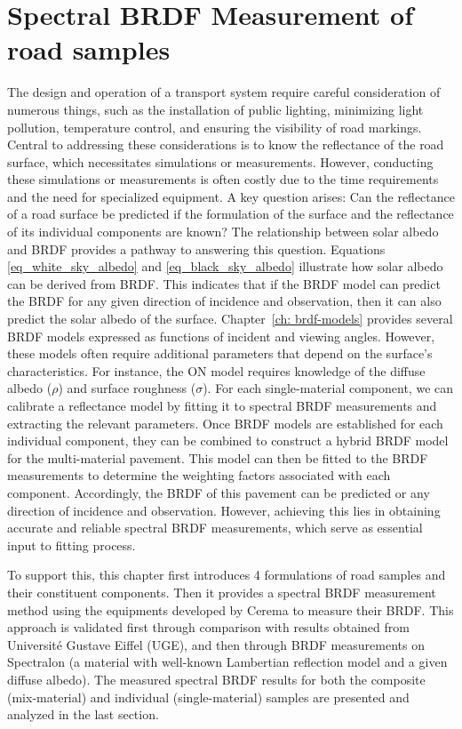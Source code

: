 \chapter{Spectral BRDF Measurement of road samples}



The design and operation of a transport system require careful consideration of numerous things, such as the installation of public lighting, minimizing light pollution, temperature control, and ensuring the visibility of road markings.
Central to addressing these considerations is to know the reflectance of the road surface, which necessitates simulations or measurements.
However, conducting these simulations or measurements is often costly due to the time requirements and the need for specialized equipment.
A key question arises: Can the reflectance of a road surface be predicted if the formulation of the surface and the reflectance of its individual components are known?
The relationship between solar albedo and BRDF provides a pathway to answering this question.
Equations \eqref{eq_white_sky_albedo} and \eqref{eq_black_sky_albedo} illustrate how solar albedo can be derived from BRDF.
This indicates that if the BRDF model can predict the BRDF for any given direction of incidence and observation, then it can also predict the solar albedo of the surface.
Chapter~\ref{ch: brdf-models} provides several BRDF models expressed as functions of incident and viewing angles.
However, these models often require additional parameters that depend on the surface's characteristics.
For instance, the ON model requires knowledge of the diffuse albedo ($\rho$) and surface roughness ($\sigma$).
For each single-material component, we can calibrate a reflectance model by fitting it to spectral BRDF measurements and extracting the relevant parameters.
Once BRDF models are established for each individual component, they can be combined to construct a hybrid BRDF model for the multi-material pavement.
This model can then be fitted to the BRDF measurements to determine the weighting factors associated with each component.
Accordingly, the BRDF of this pavement can be predicted or any direction of incidence and observation.
However, achieving this lies in obtaining accurate and reliable spectral BRDF measurements, which serve as essential input to fitting process.

To support this, this chapter first introduces 4 formulations of road samples and their constituent components.
Then it provides a spectral BRDF measurement method using the equipments developed by Cerema to measure their BRDF.
This approach is validated first through comparison with results obtained from Université Gustave Eiffel (UGE), and then through BRDF measurements on Spectralon (a material with well-known Lambertian reflection model and a given diffuse albedo).
The measured spectral BRDF results for both the composite (mix-material) and individual (single-material) samples are presented and analyzed in the last section.


